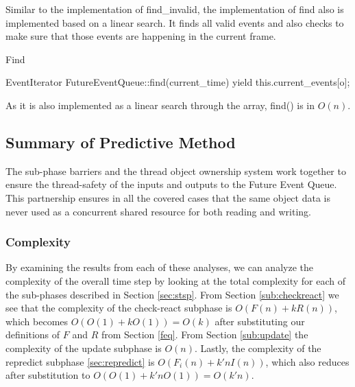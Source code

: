 \documentclass[CEJCS,PDF]{cej} %
\begin{document}
Similar to the implementation of find\_invalid, the implementation of find also is implemented based on a linear search.  It finds all valid events
and also checks to make sure that those events are happening in the current frame.

\begin{algorithm}
\caption{Find}
\begin{algorithmic}
\STATE EventIterator FutureEventQueue::find(current\_time)
		\STATE {}
		\STATE yield this.current\_events[o];
	\ENDIF
\ENDFOR
\end{algorithmic}
\end{algorithm}

As it is also implemented as a linear search through the array, find() is in $O(n)$.

\subsection{Summary of Predictive Method}
	The sub-phase barriers and the thread object ownership system work together to ensure the thread-safety of the inputs and outputs to the Future Event Queue.
This partnership ensures in all the covered cases that the same object data is never used as a concurrent shared resource for both reading and writing.  

\subsubsection{Complexity}

By examining the results from each of these analyses, we can analyze the complexity of the overall time step by looking at the total complexity for each of the sub-phases described in Section \ref{sec:stsp}.
From Section \ref{sub:checkreact} we see that the complexity of the check-react subphase is $O(F(n)+k R(n))$, which becomes $O(O(1)+kO(1))=O(k)$ after substituting our definitions of $F$ and $R$ from Section \ref{feq}.
From Section \ref{sub:update} the complexity of the update subphase is $O(n)$.  
Lastly, the complexity of the repredict subphase \ref{sec:repredict} is $O(F_i(n)+k' n I(n))$, which also reduces after substitution to $O(O(1)+k' n O(1))=O(k'n)$.
\end{document}
